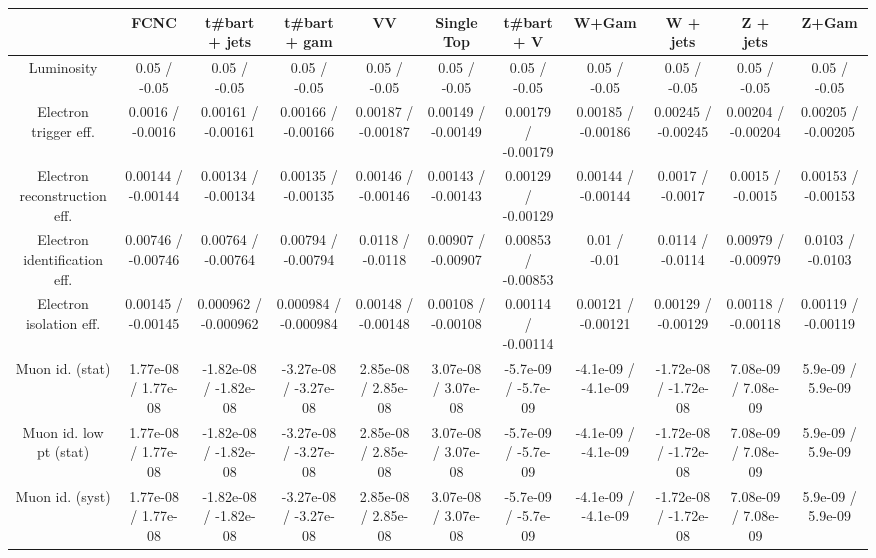 \begin{table}[htbp]
\begin{center}
\footnotesize
\begin{tabular}{|c|c|c|c|c|c|c|c|c|c|c|}
\hline 
      & FCNC      & t#bar{t} + jets      & t#bar{t} +  gam      & VV      & Single Top      & t#bar{t} + V      & W+Gam      & W + jets      & Z + jets      & Z+Gam \\ 
\hline 
  Luminosity & 0.05 / -0.05 & 0.05 / -0.05 & 0.05 / -0.05 & 0.05 / -0.05 & 0.05 / -0.05 & 0.05 / -0.05 & 0.05 / -0.05 & 0.05 / -0.05 & 0.05 / -0.05 & 0.05 / -0.05 \\ 
  Electron trigger eff. & 0.0016 / -0.0016 & 0.00161 / -0.00161 & 0.00166 / -0.00166 & 0.00187 / -0.00187 & 0.00149 / -0.00149 & 0.00179 / -0.00179 & 0.00185 / -0.00186 & 0.00245 / -0.00245 & 0.00204 / -0.00204 & 0.00205 / -0.00205 \\ 
  Electron reconstruction eff. & 0.00144 / -0.00144 & 0.00134 / -0.00134 & 0.00135 / -0.00135 & 0.00146 / -0.00146 & 0.00143 / -0.00143 & 0.00129 / -0.00129 & 0.00144 / -0.00144 & 0.0017 / -0.0017 & 0.0015 / -0.0015 & 0.00153 / -0.00153 \\ 
  Electron identification eff. & 0.00746 / -0.00746 & 0.00764 / -0.00764 & 0.00794 / -0.00794 & 0.0118 / -0.0118 & 0.00907 / -0.00907 & 0.00853 / -0.00853 & 0.01 / -0.01 & 0.0114 / -0.0114 & 0.00979 / -0.00979 & 0.0103 / -0.0103 \\ 
  Electron isolation eff. & 0.00145 / -0.00145 & 0.000962 / -0.000962 & 0.000984 / -0.000984 & 0.00148 / -0.00148 & 0.00108 / -0.00108 & 0.00114 / -0.00114 & 0.00121 / -0.00121 & 0.00129 / -0.00129 & 0.00118 / -0.00118 & 0.00119 / -0.00119 \\ 
  Muon id. (stat) & 1.77e-08 / 1.77e-08 & -1.82e-08 / -1.82e-08 & -3.27e-08 / -3.27e-08 & 2.85e-08 / 2.85e-08 & 3.07e-08 / 3.07e-08 & -5.7e-09 / -5.7e-09 & -4.1e-09 / -4.1e-09 & -1.72e-08 / -1.72e-08 & 7.08e-09 / 7.08e-09 & 5.9e-09 / 5.9e-09 \\ 
  Muon id. low pt (stat) & 1.77e-08 / 1.77e-08 & -1.82e-08 / -1.82e-08 & -3.27e-08 / -3.27e-08 & 2.85e-08 / 2.85e-08 & 3.07e-08 / 3.07e-08 & -5.7e-09 / -5.7e-09 & -4.1e-09 / -4.1e-09 & -1.72e-08 / -1.72e-08 & 7.08e-09 / 7.08e-09 & 5.9e-09 / 5.9e-09 \\ 
  Muon id. (syst) & 1.77e-08 / 1.77e-08 & -1.82e-08 / -1.82e-08 & -3.27e-08 / -3.27e-08 & 2.85e-08 / 2.85e-08 & 3.07e-08 / 3.07e-08 & -5.7e-09 / -5.7e-09 & -4.1e-09 / -4.1e-09 & -1.72e-08 / -1.72e-08 & 7.08e-09 / 7.08e-09 & 5.9e-09 / 5.9e-09 \\ 

\end{tabular}
\end{center}
\end{table}
